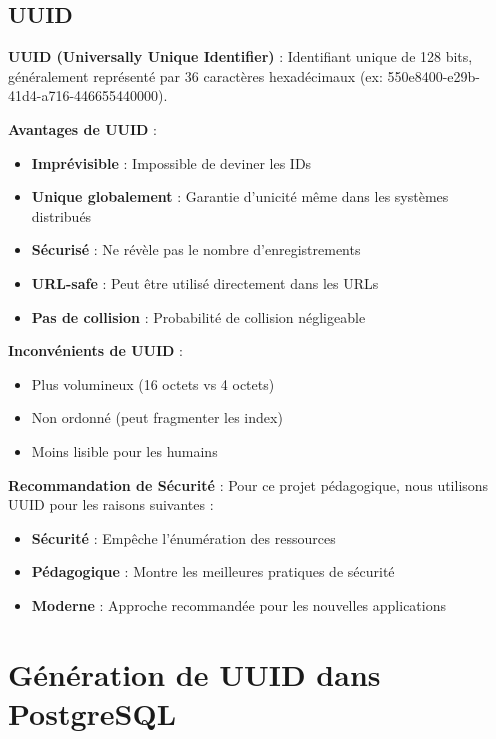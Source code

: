 \subsection{UUID}

\begin{definitionbox}
    \textbf{UUID (Universally Unique Identifier)} : Identifiant unique de 128 bits, généralement représenté par 36 caractères hexadécimaux (ex: 550e8400-e29b-41d4-a716-446655440000).
\end{definitionbox}

\textbf{Avantages de UUID} :
\begin{itemize}
    \item \textbf{Imprévisible} : Impossible de deviner les IDs
    \item \textbf{Unique globalement} : Garantie d'unicité même dans les systèmes distribués
    \item \textbf{Sécurisé} : Ne révèle pas le nombre d'enregistrements
    \item \textbf{URL-safe} : Peut être utilisé directement dans les URLs
    \item \textbf{Pas de collision} : Probabilité de collision négligeable
\end{itemize}

\textbf{Inconvénients de UUID} :
\begin{itemize}
    \item Plus volumineux (16 octets vs 4 octets)
    \item Non ordonné (peut fragmenter les index)
    \item Moins lisible pour les humains
\end{itemize}

\begin{securitybox}
    \textbf{Recommandation de Sécurité} :
    Pour ce projet pédagogique, nous utilisons UUID pour les raisons suivantes :
    \begin{itemize}
        \item \textbf{Sécurité} : Empêche l'énumération des ressources
        \item \textbf{Pédagogique} : Montre les meilleures pratiques de sécurité
        \item \textbf{Moderne} : Approche recommandée pour les nouvelles applications
    \end{itemize}
\end{securitybox}

\section{Génération de UUID dans PostgreSQL}

